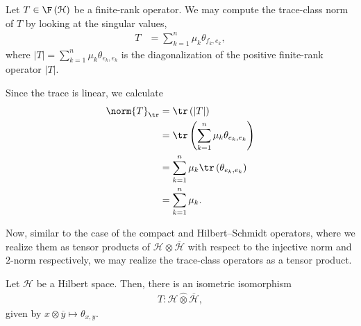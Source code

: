 \documentclass[10pt]{mypackage}
\begin{document}
\begin{example}
  Let $T\in \F\left( \mathcal{H} \right)$ be a finite-rank operator. We may compute the trace-class norm of $T$ by looking at the singular values,
  \begin{align*}
    T &= \sum_{k=1}^{n}\mu_k\theta_{f_k,e_k},
  \end{align*}
  where $\left\vert T \right\vert = \sum_{k=1}^{n}\mu_k\theta_{e_k,e_k}$ is the diagonalization of the positive finite-rank operator $\left\vert T \right\vert$.\newline

  Since the trace is linear, we calculate
  \begin{align*}
    \norm{T}_{\tr} &= \tr\left( \left\vert T \right\vert \right)\\
                   &= \tr\left( \sum_{k=1}^{n}\mu_k\theta_{e_k,e_k} \right)\\
                   &= \sum_{k=1}^{n}\mu_k\tr\left( \theta_{e_k,e_k} \right)\\
                   &= \sum_{k=1}^{n}\mu_k.
  \end{align*}
\end{example}
Now, similar to the case of the compact and Hilbert--Schmidt operators, where we realize them as tensor products of $\mathcal{H} \otimes \overline{\mathcal{H}}$ with respect to the injective norm and $2$-norm respectively, we may realize the trace-class operators as a tensor product.
\begin{proposition}
  Let $\mathcal{H}$ be a Hilbert space. Then, there is an isometric isomorphism
  \begin{align*}
    T\colon \mathcal{H}\hat\otimes \overline{\mathcal{H}},
  \end{align*}
  given by $x\otimes \overline{y} \mapsto \theta_{x,y}$.
\end{proposition}
\end{document}
